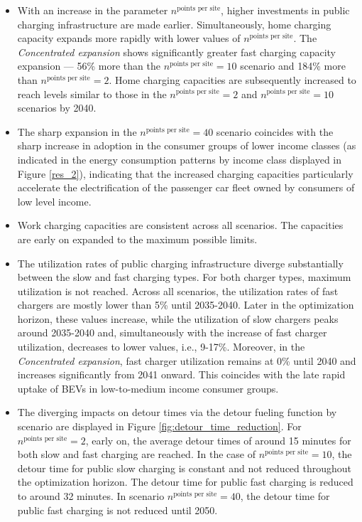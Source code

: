         \begin{itemize}
            \item With an increase in the parameter $n^{\textrm{points per site}}$, higher investments in public charging infrastructure are made earlier. Simultaneously, home charging capacity expands more rapidly with lower values of $n^{\textrm{points per site}}$. The \textit{Concentrated expansion} shows significantly greater fast charging capacity expansion --- 56\% more than the $n^{\textrm{points per site}} = 10$ scenario and 184\% more than $n^{\textrm{points per site}} = 2$. Home charging capacities are subsequently increased to reach levels similar to those in the $n^{\textrm{points per site}} = 2$ and $n^{\textrm{points per site}} = 10$ scenarios by 2040.
            \item The sharp expansion in the $n^{\textrm{points per site}} = 40$ scenario coincides with the sharp increase in adoption in the consumer groups of lower income classes (as indicated in the energy consumption patterns by income class displayed in Figure \ref{res_2}), indicating that the increased charging capacities particularly accelerate the electrification of the passenger car fleet owned by consumers of low level income.
            \item Work charging capacities are consistent across all scenarios. The capacities are early on expanded to the maximum possible limits.
            \item The utilization rates of public charging infrastructure diverge substantially between the slow and fast charging types. For both charger types, maximum utilization is not reached. Across all scenarios, the utilization rates of fast chargers are mostly lower than 5\% until 2035-2040. Later in the optimization horizon, these values increase, while the utilization of slow chargers peaks around 2035-2040 and, simultaneously with the increase of fast charger utilization, decreases to lower values, i.e., 9-17\%. Moreover, in the \textit{Concentrated expansion}, fast charger utilization remains at 0\% until 2040 and increases significantly from 2041 onward. This coincides with the late rapid uptake of \acp{BEV} in low-to-medium income consumer groups.
            \item The diverging impacts on detour times via the detour fueling function by scenario are displayed in Figure \ref{fig:detour_time_reduction}. For $n^{\textrm{points per site}} = 2$, early on, the average detour times of around 15 minutes for both slow and fast charging are reached. In the case of $n^{\textrm{points per site}} = 10$, the detour time for public slow charging is constant and not reduced throughout the optimization horizon. The detour time for public fast charging is reduced to around 32 minutes. In scenario $n^{\textrm{points per site}} = 40$, the detour time for public fast charging is not reduced until 2050.

\end{itemize}

